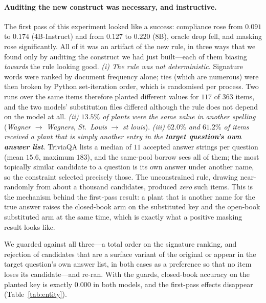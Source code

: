 \documentclass[11pt]{article}
\begin{document}
\paragraph{Auditing the new construct was necessary, and instructive.}
The first pass of this experiment looked like a success: compliance rose from $0.091$ to
$0.174$ (4B-Instruct) and from $0.127$ to $0.220$ (8B), oracle drop fell, and masking rose
significantly. All of it was an artifact of the new rule, in three ways that we found only by
auditing the construct we had just built---each of them biasing \emph{towards} the rule
looking good.
\emph{(i) The rule was not deterministic.} Signature words were ranked by document frequency
alone; ties (which are numerous) were then broken by Python set-iteration order, which is
randomised per process. Two runs over the same items therefore planted different values for
$117$ of $363$ items, and the two models' substitution files differed although the rule does
not depend on the model at all.
\emph{(ii) $13.5\%$ of plants were the same value in another spelling} (\emph{Wagner}
$\rightarrow$ \emph{Wagners}, \emph{St.~Louis} $\rightarrow$ \emph{st louis}).
\emph{(iii) $62.0\%$ and $61.2\%$ of items received a plant that is simply another entry in
the \textbf{target question's own answer list}}. TriviaQA lists a median of $11$ accepted
answer strings per question (mean $15.6$, maximum $183$), and the same-pool borrow sees all
of them; the most topically similar candidate to a question is its own answer under another
name, so the constraint selected precisely those. The unconstrained rule, drawing
near-randomly from about a thousand candidates, produced \emph{zero} such items. This is the
mechanism behind the first-pass result: a plant that is another name for the true answer
raises the closed-book arm on the substituted key and the open-book substituted arm at the
same time, which is exactly what a positive masking result looks like.

We guarded against all three---a total order on the signature ranking, and rejection of
candidates that are a surface variant of the original or appear in the target question's own
answer list, in both cases as a preference so that no item loses its candidate---and re-ran.
With the guards, closed-book accuracy on the planted key is exactly $0.000$ in both models,
and the first-pass effects disappear (Table~\ref{tab:entity}).
\end{document}

